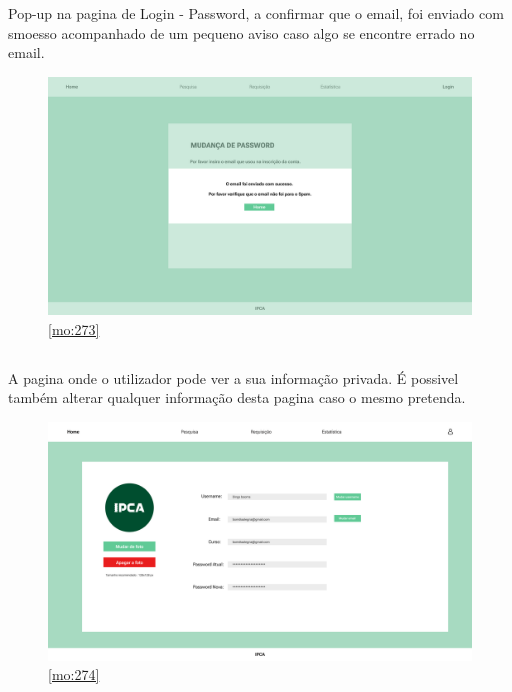 Pop-up na pagina de Login - Password, a confirmar que o email, foi enviado com smoesso acompanhado de um pequeno aviso caso algo se encontre errado no email.

\begin{figure}[H]
	\centering
	\includegraphics[width=1\linewidth]{../Mockups/PNGs/Login - Password confirmacao.png}  %
	\caption{\ref{mo:273}}
	\label{fig:chap273}
\end{figure}


\newpage 

\subsection{}

A pagina onde o utilizador pode ver a sua informação privada. É possivel também alterar qualquer informação desta pagina caso o mesmo pretenda.

\begin{figure}[H]
	\centering
	\includegraphics[width=1\linewidth]{../Mockups/PNGs/Perfil do utilizador.png}  %
	\caption{\ref{mo:274}}
	\label{fig:chap274}
\end{figure}

